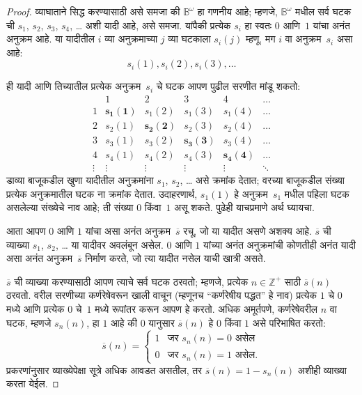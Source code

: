 \documentclass[11pt,a4paper,openany]{book}
\theoremstyle{definition}
\newcommand{\PosInt}{\mathbb{Z}^{+}}
\newcommand{\Bin}{\mathbb{B}}
\begin{document}
\begin{proof}
व्याघाताने सिद्ध करण्यासाठी असे समजा की $\Bin^\omega$ हा गणनीय आहे; म्हणजे,
$\Bin^\omega$ मधील सर्व घटक ची $s_{1}$, $s_{2}$, $s_{3}$,
$s_{4}$, \dots{} अशी यादी आहे, असे समजा. यांपैकी प्रत्येक $s_i$ हा
स्वतः $0$ आणि~$1$ यांचा अनंत अनुक्रम आहे. या यादीतील $i$ व्या अनुक्रमाच्या
$j$ व्या घटकाला $s_i(j)$ म्हणू. मग $i$ वा अनुक्रम~$s_i$ असा आहे:
\[
s_i(1), s_i(2), s_i(3), \dots
\]

ही यादी आणि तिच्यातील प्रत्येक अनुक्रम~$s_i$ चे घटक आपण पुढील सरणीत
मांडू शकतो:
\[
\begin{array}{c|c|c|c|c|c}
& 1 & 2 & 3 & 4 & \dots \\\hline
1 & \mathbf{s_{1}(1)} & s_{1}(2) & s_{1}(3) & s_1(4) & \dots \\\hline
2 & s_{2}(1)& \mathbf{s_{2}(2)} & s_2(3) & s_2(4) & \dots \\\hline
3 & s_{3}(1)& s_{3}(2) & \mathbf{s_3(3)} & s_3(4) & \dots \\\hline
4 & s_{4}(1)& s_{4}(2) & s_4(3) & \mathbf{s_4(4)} & \dots \\\hline
\vdots & \vdots & \vdots & \vdots & \vdots & \mathbf{\ddots}
\end{array}
\]
डाव्या बाजूकडील खुणा यादीतील अनुक्रमांना $s_1$, $s_2$, \dots{} असे
क्रमांक देतात; वरच्या बाजूकडील संख्या प्रत्येक अनुक्रमातील घटक
ना क्रमांक देतात. उदाहरणार्थ, $s_{1}(1)$ हे अनुक्रम~$s_{1}$ मधील
पहिला घटक असलेल्या संख्येचे नाव आहे; ती संख्या $0$ किंवा~$1$
असू शकते. पुढेही याचप्रमाणे अर्थ घ्यायचा.

आता आपण $0$ आणि $1$ यांचा असा अनंत अनुक्रम~$\overline{s}$ रचू, जो
या यादीत असणे अशक्य आहे. $\overline{s}$ ची व्याख्या $s_1$, $s_2$,
\dots{} या यादीवर अवलंबून असेल. $0$ आणि $1$ यांच्या अनंत अनुक्रमांची
कोणतीही अनंत यादी असा अनंत अनुक्रम~$\overline{s}$ निर्माण करते, जो
त्या यादीत नसेल याची खात्री असते.

$\overline{s}$ ची व्याख्या करण्यासाठी आपण त्याचे सर्व घटक
ठरवतो; म्हणजे, प्रत्येक $n \in \PosInt$ साठी $\overline{s}(n)$
ठरवतो. वरील सरणीच्या कर्णरेषेवरून खाली वाचून (म्हणूनच ``कर्णरेषीय
पद्धत'' हे नाव) प्रत्येक $1$ चे $0$ मध्ये आणि प्रत्येक $0$ चे~$1$
मध्ये रूपांतर करून आपण हे करतो. अधिक अमूर्तपणे, कर्णरेषेवरील $n$ वा
घटक, म्हणजे $s_n(n)$, हा $1$ आहे की $0$ यानुसार
$\overline{s}(n)$ हे $0$ किंवा $1$ असे परिभाषित करतो:
\[
\overline{s}(n) =
\begin{cases}
1 & \text{जर $s_{n}(n) = 0$ असेल}\\
0 & \text{जर $s_{n}(n) = 1$ असेल}.
\end{cases}
\]
प्रकरणांनुसार व्याख्येपेक्षा सूत्रे अधिक आवडत असतील, तर
$\overline{s}(n) = 1 - s_n(n)$ अशीही व्याख्या करता येईल.


\end{proof}
\end{document}
